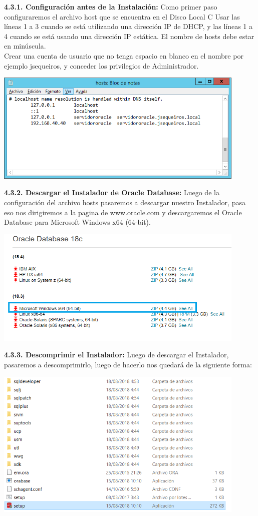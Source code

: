 \textbf {4.3.1. Configuración antes de la Instalación:} Como primer paso configuraremos el archivo host que se encuentra en el Disco Local C
Usar las líneas 1 a 3 cuando se está utilizando una dirección IP de DHCP, y las líneas 1 a 4 cuando se está usando una dirección IP estática.  El nombre de hosts debe estar en minúscula. \\
Crear una cuenta de usuario  que no tenga espacio en blanco en el nombre por ejemplo jsequeiros, y conceder los privilegios de Administrador.
\begin{center}
  \includegraphics[width=12cm]{Imagenes/Configuracion_Host.png}
\end{center}

\textbf {4.3.2. Descargar el Instalador de Oracle Database:} Luego de la configuración del archivo hosts pasaremos a descargar nuestro Instalador, pasa eso nos dirigiremos a la pagina de www.oracle.com y descargaremos el Oracle Database para Microsoft Windows x64 (64-bit).
\begin{center}
  \includegraphics[width=12cm]{Imagenes/Web_Descarga_Oracle.png}
\end{center}
\break

\textbf {4.3.3. Descomprimir el Instalador:} Luego de descargar el Instalador, pasaremos a descomprimirlo, luego de hacerlo nos quedará de la siguiente forma:
\begin{center}
  \includegraphics[width=12cm]{Imagenes/Descomprimir.png}
\end{center}

